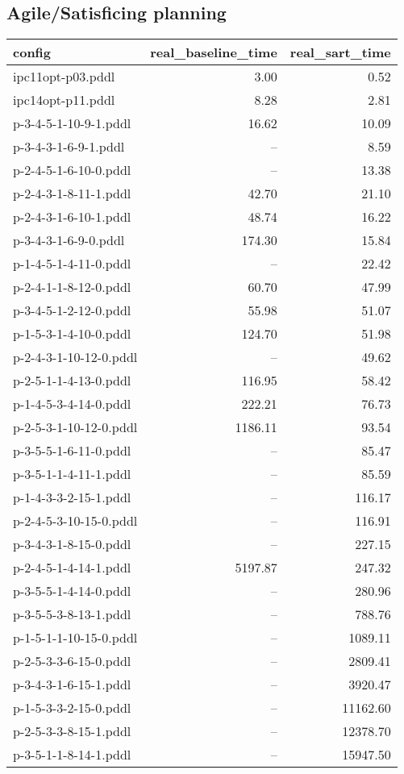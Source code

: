 \documentclass{article}
\begin{document}
                    \subsection*{Agile/Satisficing planning}
                    
                            \begin{center}
                            \scriptsize
                            \begin{tabular}{@{}l|r|r@{}}
                            config & real\_baseline\_time & real\_sart\_time\\\midrule
                             ipc11opt-p03.pddl&3.00&0.52\\
 ipc14opt-p11.pddl&8.28&2.81\\
 p-3-4-5-1-10-9-1.pddl&16.62&10.09\\
 p-3-4-3-1-6-9-1.pddl&--&8.59\\
 p-2-4-5-1-6-10-0.pddl&--&13.38\\
 p-2-4-3-1-8-11-1.pddl&42.70&21.10\\
 p-2-4-3-1-6-10-1.pddl&48.74&16.22\\
 p-3-4-3-1-6-9-0.pddl&174.30&15.84\\
 p-1-4-5-1-4-11-0.pddl&--&22.42\\
 p-2-4-1-1-8-12-0.pddl&60.70&47.99\\
 p-3-4-5-1-2-12-0.pddl&55.98&51.07\\
 p-1-5-3-1-4-10-0.pddl&124.70&51.98\\
 p-2-4-3-1-10-12-0.pddl&--&49.62\\
 p-2-5-1-1-4-13-0.pddl&116.95&58.42\\
 p-1-4-5-3-4-14-0.pddl&222.21&76.73\\
 p-2-5-3-1-10-12-0.pddl&1186.11&93.54\\
 p-3-5-5-1-6-11-0.pddl&--&85.47\\
 p-3-5-1-1-4-11-1.pddl&--&85.59\\
 p-1-4-3-3-2-15-1.pddl&--&116.17\\
 p-2-4-5-3-10-15-0.pddl&--&116.91\\
 p-3-4-3-1-8-15-0.pddl&--&227.15\\
 p-2-4-5-1-4-14-1.pddl&5197.87&247.32\\
 p-3-5-5-1-4-14-0.pddl&--&280.96\\
 p-3-5-5-3-8-13-1.pddl&--&788.76\\
 p-1-5-1-1-10-15-0.pddl&--&1089.11\\
 p-2-5-3-3-6-15-0.pddl&--&2809.41\\
 p-3-4-3-1-6-15-1.pddl&--&3920.47\\
 p-1-5-3-3-2-15-0.pddl&--&11162.60\\
 p-2-5-3-3-8-15-1.pddl&--&12378.70\\
 p-3-5-1-1-8-14-1.pddl&--&15947.50
                            \end{tabular}
                            \end{center}
                    
\end{document}
